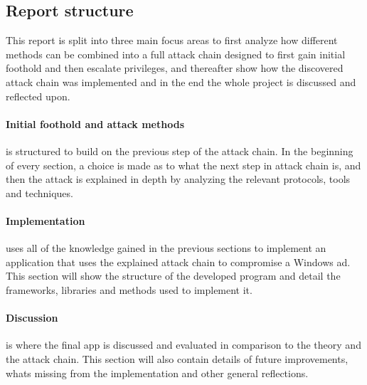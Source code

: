 \documentclass{article}
\begin{document}
\subsection{Report structure}
This report is split into three main focus areas to first analyze how different methods can be combined into a full attack chain designed to first gain initial foothold and then escalate privileges, and thereafter show how the discovered attack chain was implemented and in the end the whole project is discussed and reflected upon.

\paragraph{Initial foothold and attack methods} is structured to build on the previous step of the attack chain. In the beginning of every section, a choice is made as to what the next step in attack chain is, and then the attack is explained in depth by analyzing the relevant protocols, tools and techniques.

\paragraph{Implementation} uses all of the knowledge gained in the previous sections to implement an application that uses the explained attack chain to compromise a Windows \gls{ad}. This section will show the structure of the developed program and detail the frameworks, libraries and methods used to implement it.

\paragraph{Discussion} is where the final app is discussed and evaluated in comparison to the theory and the attack chain. This section will also contain details of future improvements, whats missing from the implementation and other general reflections.
\end{document}
